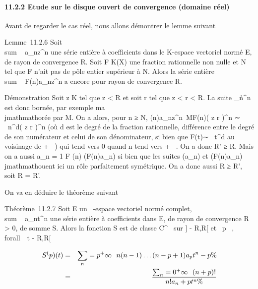\documentclass[]{article}
\begin{document}
\paragraph{11.2.2 Etude sur le disque ouvert de convergence (domaine
réel)}

Avant de regarder le cas réel, nous allons démontrer le lemme suivant

Lemme~11.2.6 Soit \\sum ~
a_nz^n une série entière à coefficients dans le
K-espace vectoriel normé E, de rayon de convergence R. Soit F \in K(X) une
fraction rationnelle non nulle et N \in {}~ tel que F n'ait pas de pôle
entier supérieur à N. Alors la série entière
\\sum ~
F(n)a_nz^n a encore pour rayon de convergence R.

Démonstration Soit z \in K tel que z \textless{} R et
soit r tel que z \textless{} r \textless{} R. La
suite
\a_n\r^n
est donc bornée, par exemple ma\\jmathmathorée par M. On a alors, pour n ≥ N,
\F(n)a_nz^n\
\leq MF(n)\left (
z \over r \right
)^n ∼ \lambda~n^d\left (
z \over r \right
)^n (où d est le degré de la fraction rationnelle, différence
entre le degré de son numérateur et celui de son dénominateur, si bien
que F(t)∼ \lambda~t^d au voisinage de + \infty~) qui
tend vers 0 quand n tend vers + \infty~. On a donc R' ≥ R. Mais on a aussi
a_n = 1 \over F (n)\left
(F(n)a_n\right ) si bien que les suites
(a_n) et (F(n)a_n) \\jmathmathouent ici un rôle parfaitement
symétrique. On a donc aussi R ≥ R', soit R = R'.

On va en déduire le théorème suivant

Théorème~11.2.7 Soit E un ~-espace vectoriel normé complet,
\\sum ~
a_nt^n une série entière à coefficients dans E, de
rayon de convergence R \textgreater{} 0, de somme S. Alors la fonction S
est de classe C^\infty~ sur {]} - R,R{[} et
\forall~p \in {}~, \\forall~~t \in{]} -
R,R{[}

\begin{align*} S^(p)(t)& =&
\sum _n=p^+\infty~~n(n -
1)\ldots(n - p + 1)a_
pt^n-p\%& \\ & =&
\sum _n=0^+\infty~~ (n + p)!
\over n! a_n+pt^n \%&
\\ \end{align*}
\end{document}
